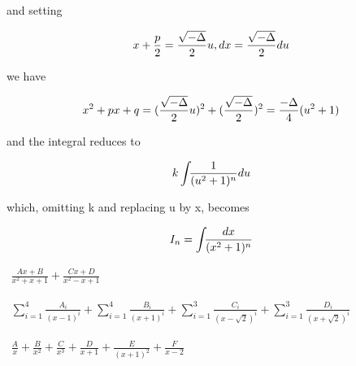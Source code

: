 \documentclass[11pt]{amsbook}
\begin{document}
    and setting
    
    $$x+{{p}\over{2}}={{{\sqrt{-\Delta}}\over{2}}u}, dx={{{\sqrt{-\Delta}}\over{2}}du}$$
    
    we have
    
    $$x^2+px+q={({{{\sqrt{-\Delta}}\over{2}}u})^2+({{{\sqrt{-\Delta}}\over{2}}})^2}={{{-\Delta}\over{4}}(u^2+1)}$$
    
    and the integral reduces to
    
    $$k\int_{}{}{{1}\over{(u^2+1)^n}}du$$
    
    which, omitting k and replacing u by x, becomes
    
    $$ {I_{n}} = {\int_{}{}{{dx}\over{(x^2+1)^n}}}$$
    
\begin{hEnumerateAlpha}
\setcounter{enumi}{4}
\item $\begin{aligned}\frac{Ax+B}{x^{2}+x+1} + \frac{Cx+D}{x^{2}-x+1}\end{aligned}$
\item $\begin{aligned}\sum_{i=1}^4 \frac{A_{i}}{(x-1)^{i}} + \sum_{i=1}^4 \frac{B_{i}}{(x+1)^{i}} + \sum_{i=1}^3 \frac{C_{i}}{(x-\sqrt{2})^{i}} + \sum_{i=1}^3 \frac{D_{i}}{(x+\sqrt{2})^{i}}\end{aligned}$
\item $\begin{aligned}\frac{A}{x} + \frac{B}{x^{2}} + \frac{C}{x^{3}} + \frac{D}{x+1} + \frac{E}{(x+1)^{2}} + \frac{F}{x-2}\end{aligned}$
\end{hEnumerateAlpha}
\end{document}
